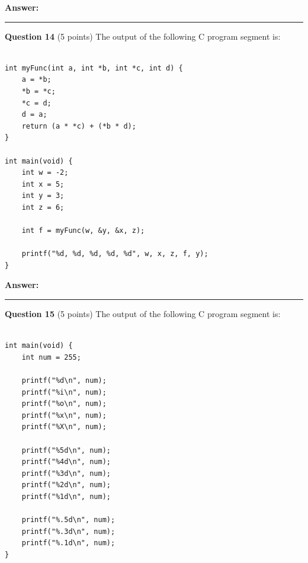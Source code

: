 \documentclass{exam}
\begin{document}
\textbf{Answer:}

\newpage




\begin{center}\noindent\rule{6in}{0.4pt}\end{center}

\textbf{Question 14} (5 points) The output of the following C program segment is:

\begin{lstlisting}

int myFunc(int a, int *b, int *c, int d) {
	a = *b;
	*b = *c;
	*c = d;
	d = a;
	return (a * *c) + (*b * d);
}

int main(void) {
	int w = -2;	
	int x = 5;
	int y = 3;
	int z = 6;
	
	int f = myFunc(w, &y, &x, z);
	
	printf("%d, %d, %d, %d, %d", w, x, z, f, y);
}

\end{lstlisting}

\textbf{Answer:}

\newpage




\begin{center}\noindent\rule{6in}{0.4pt}\end{center}

\textbf{Question 15} (5 points) The output of the following C program segment is:

\begin{lstlisting}

int main(void) {
	int num = 255;
	
	printf("%d\n", num);
	printf("%i\n", num);
	printf("%o\n", num);
	printf("%x\n", num);
	printf("%X\n", num);
	
	printf("%5d\n", num);
	printf("%4d\n", num);
	printf("%3d\n", num);
	printf("%2d\n", num);
	printf("%1d\n", num);
	
	printf("%.5d\n", num);
	printf("%.3d\n", num);
	printf("%.1d\n", num);
}

\end{lstlisting}
\end{document}
